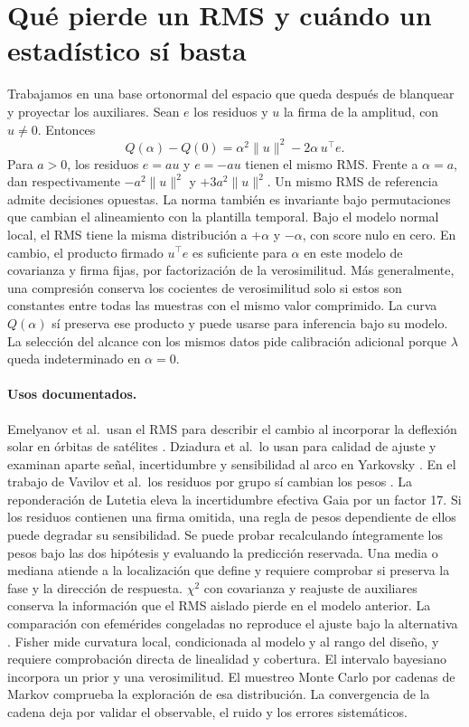 \documentclass[11pt,a4paper]{article}
\begin{document}
\section{Qué pierde un RMS y cuándo un estadístico sí basta}
\label{sec:rmsloss}
Trabajamos en una base ortonormal del espacio que queda después de blanquear y proyectar los auxiliares. Sean $e$ los residuos y $u$ la firma de la amplitud, con $u\ne0$. Entonces
\begin{equation}
 Q(\alpha)-Q(0)=\alpha^2\|u\|^2-2\alpha\,u^\top e .
\end{equation}
Para $a>0$, los residuos $e=au$ y $e=-au$ tienen el mismo RMS. Frente a $\alpha=a$, dan respectivamente $-a^2\|u\|^2$ y $+3a^2\|u\|^2$. Un mismo RMS de referencia admite decisiones opuestas. La norma también es invariante bajo permutaciones que cambian el alineamiento con la plantilla temporal. Bajo el modelo normal local, el RMS tiene la misma distribución a $+\alpha$ y $-\alpha$, con score nulo en cero. En cambio, el producto firmado $u^\top e$ es suficiente para $\alpha$ en este modelo de covarianza y firma fijas, por factorización de la verosimilitud. Más generalmente, una compresión conserva los cocientes de verosimilitud solo si estos son constantes entre todas las muestras con el mismo valor comprimido. La curva $Q(\alpha)$ sí preserva ese producto y puede usarse para inferencia bajo su modelo. La selección del alcance con los mismos datos pide calibración adicional porque $\lambda$ queda indeterminado en $\alpha=0$.

\paragraph{Usos documentados.} Emelyanov et al.\ usan el RMS para describir el cambio al incorporar la deflexión solar en órbitas de satélites \cite{emelyanov}. Dziadura et al.\ lo usan para calidad de ajuste y examinan aparte señal, incertidumbre y sensibilidad al arco en Yarkovsky \cite{dziadura}. En el trabajo de Vavilov et al.\ los residuos por grupo sí cambian los pesos \cite{vavilov}. La reponderación de Lutetia eleva la incertidumbre efectiva Gaia por un factor 17. Si los residuos contienen una firma omitida, una regla de pesos dependiente de ellos puede degradar su sensibilidad. Se puede probar recalculando íntegramente los pesos bajo las dos hipótesis y evaluando la predicción reservada. Una media o mediana atiende a la localización que define y requiere comprobar si preserva la fase y la dirección de respuesta. $\chi^2$ con covarianza y reajuste de auxiliares conserva la información que el RMS aislado pierde en el modelo anterior. La comparación con efemérides congeladas no reproduce el ajuste bajo la alternativa \cite{inpop}. Fisher mide curvatura local, condicionada al modelo y al rango del diseño, y requiere comprobación directa de linealidad y cobertura. El intervalo bayesiano incorpora un prior y una verosimilitud. El muestreo Monte Carlo por cadenas de Markov comprueba la exploración de esa distribución. La convergencia de la cadena deja por validar el observable, el ruido y los errores sistemáticos.
\end{document}
